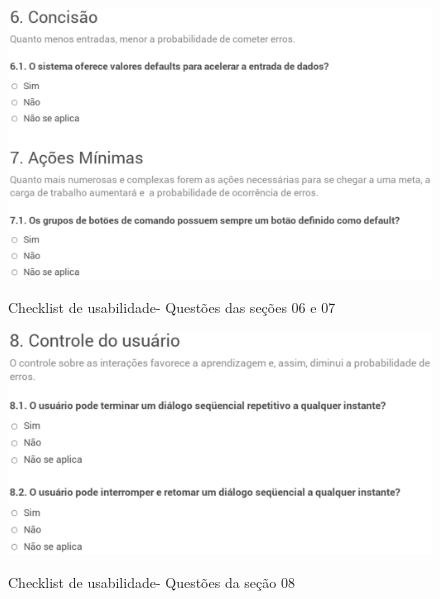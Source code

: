 	\begin{figure}[!h]
    	\centering
    	\includegraphics[keepaspectratio=true,scale=0.45]
      		{figuras/check06.eps}
    	\label{check04}
		\caption{Checklist de usabilidade- Questões das seções 06 e 07}
	\end{figure}


	\begin{figure}[!h]
    	\centering
    	\includegraphics[keepaspectratio=true,scale=0.45]
      		{figuras/check08.eps}
    	\label{check04}
		\caption{Checklist de usabilidade- Questões da seção 08}
	\end{figure}


